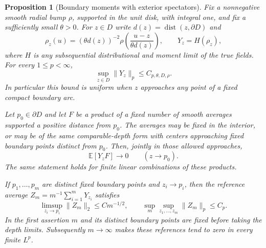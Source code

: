 \documentclass[11pt]{article}
\newcommand{\E}{\mathbb E}
\DeclareMathOperator{\dist}{dist}
\newtheorem{proposition}[theorem]{Proposition}
\theoremstyle{definition}
\theoremstyle{remark}
\numberwithin{equation}{section}
\begin{document}
\begin{proposition}[Boundary moments with exterior spectators]
\label{prop:boundary-moments}
Fix a nonnegative smooth radial bump $\rho$, supported in the unit
disk, with integral one, and fix a sufficiently small $\theta>0$.
For $z\in D$ write $d(z)=\dist(z,\partial D)$ and
\[
 \rho_z(u)=(\theta d(z))^{-2}
       \rho\!\left(\frac{u-z}{\theta d(z)}\right),\qquad
 Y_z=H(\rho_z),
\]
where $H$ is any subsequential distributional and moment limit of
the true fields.  For every $1\le p<\infty$,
\begin{equation}
 \sup_{z\in D}\|Y_z\|_p\le C_{p,\theta,D,\rho}.
 \label{boundary:uniform-depth-moments}
\end{equation}
In particular this bound is uniform when $z$ approaches any point
of a fixed compact boundary arc.

Let $p_0\in\partial D$ and let $F$ be a product of a fixed number
of smooth averages supported a positive distance from $p_0$.
The averages may be fixed in the interior, or may be of the same
comparable-depth form with centers approaching fixed boundary
points distinct from $p_0$.  Then, jointly in those allowed
approaches,
\begin{equation}
 \E[Y_zF]\longrightarrow0\qquad(z\longrightarrow p_0).
 \label{boundary:spectator-vanishing}
\end{equation}
The same statement holds for finite linear combinations of these
products.

If $p_1,\ldots,p_m$ are distinct fixed boundary points and
$z_i\to p_i$, then the reference average
$Z_m=m^{-1}\sum_{i=1}^mY_{z_i}$ satisfies
\begin{equation}
 \limsup_{z_i\to p_i}\|Z_m\|_2\le C m^{-1/2},
 \qquad \sup_m\sup_{z_1,\ldots,z_m}\|Z_m\|_p\le C_p.
 \label{boundary:reference-average}
\end{equation}
In the first assertion $m$ and its distinct boundary points are
fixed before taking the depth limits.  Subsequently $m\to\infty$
makes these references tend to zero in every finite $L^p$.
\end{proposition}
\end{document}
